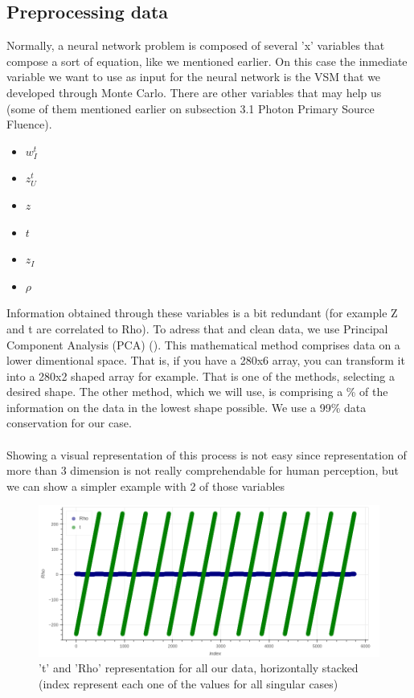 \documentclass[openany]{article}
\begin{document}
\newpage 

\subsection{Preprocessing data}

Normally, a neural network problem is composed of several 'x' variables that compose a sort of equation, like we mentioned earlier. On this case the inmediate variable we want to use as input for the neural network is the VSM that we developed through Monte Carlo. There are other variables that may help us (some of them mentioned earlier on subsection 3.1 Photon Primary Source Fluence).


\begin{itemize}
    \item \(w_I^t\)
    \item \(z_U^t\)
    \item \(z\)
    \item \(t\)
    \item \(z_I\)
    \item \( \rho \)
\end{itemize}

Information obtained through these variables is a bit redundant (for example Z and t are correlated to Rho). To adress that and clean data, we use Principal Component Analysis (PCA) (\cite{tipping1998mixtures}). This mathematical method comprises data on a lower dimentional space. That is, if you have a 280x6 array, you can transform it into a 280x2 shaped array for example. That is one of the methods, selecting a desired shape. The other method, which we will use, is comprising a \% of the information on the data in the lowest shape possible. We use a 99\% data conservation for our case.\\
\\
Showing a visual representation of this process is not easy since representation of more than 3 dimension is not really comprehendable for human perception, but we can show a simpler example with 2 of those variables 

\begin{figure}[!h]
    \centering
    \includegraphics[width=\textwidth]{PrePCA.png}
    \caption{'t' and 'Rho' representation for all our data, horizontally stacked (index represent each one of the values for all singular cases)}
    \label{fig:my_label}
\end{figure}
\end{document}
